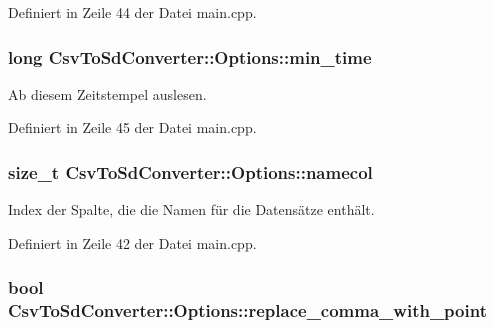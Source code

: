 Definiert in Zeile 44 der Datei main.\-cpp.

\hypertarget{structCsvToSdConverter_1_1Options_a076f7b517fccb4a20dd23905f27b8784}{
\subsubsection[{min\-\_\-time}]{\setlength{\rightskip}{0pt plus 5cm}long Csv\-To\-Sd\-Converter\-::\-Options\-::min\-\_\-time}}\label{structCsvToSdConverter_1_1Options_a076f7b517fccb4a20dd23905f27b8784}


Ab diesem Zeitstempel auslesen. 



Definiert in Zeile 45 der Datei main.\-cpp.

\hypertarget{structCsvToSdConverter_1_1Options_a49f5541b593cb8df87547d16a1738dc5}{
\subsubsection[{namecol}]{\setlength{\rightskip}{0pt plus 5cm}size\-\_\-t Csv\-To\-Sd\-Converter\-::\-Options\-::namecol}}\label{structCsvToSdConverter_1_1Options_a49f5541b593cb8df87547d16a1738dc5}


Index der Spalte, die die Namen für die Datensätze enthält. 



Definiert in Zeile 42 der Datei main.\-cpp.

\hypertarget{structCsvToSdConverter_1_1Options_abadbda6c2d744b869b321eb05b3b1ca0}{
\subsubsection[{replace\-\_\-comma\-\_\-with\-\_\-point}]{\setlength{\rightskip}{0pt plus 5cm}bool Csv\-To\-Sd\-Converter\-::\-Options\-::replace\-\_\-comma\-\_\-with\-\_\-point}}\label{structCsvToSdConverter_1_1Options_abadbda6c2d744b869b321eb05b3b1ca0}


